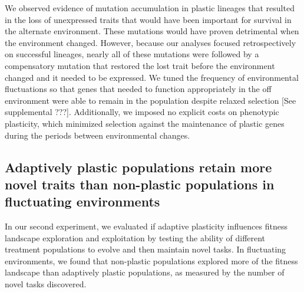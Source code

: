 We observed evidence of mutation accumulation in plastic lineages that resulted in the loss of unexpressed traits that would have been important for survival in the alternate environment.
These mutations would have proven detrimental when the environment changed.
However, because our analyses focused retrospectively on successful lineages, nearly all of these mutations were followed by a compensatory mutation that restored the lost trait before the environment changed and it needed to be expressed.
We tuned the frequency of environmental fluctuations so that genes that needed to function appropriately in the off environment were able to remain in the population despite relaxed selection [See supplemental ???].
Additionally, we imposed no explicit costs on phenotypic plasticity, which minimized selection against the maintenance of plastic genes during the periods between environmental changes.  

\vspace{0.25cm}
\subsection{Adaptively plastic populations retain more novel traits than non-plastic populations in fluctuating environments}

In our second experiment, we evaluated if adaptive plasticity influences fitness landscape exploration and exploitation by testing the ability of different treatment populations to evolve and then maintain novel tasks. 
In fluctuating environments, we found that non-plastic populations explored more of the fitness landscape than adaptively plastic populations, as measured by the number of novel tasks discovered.

